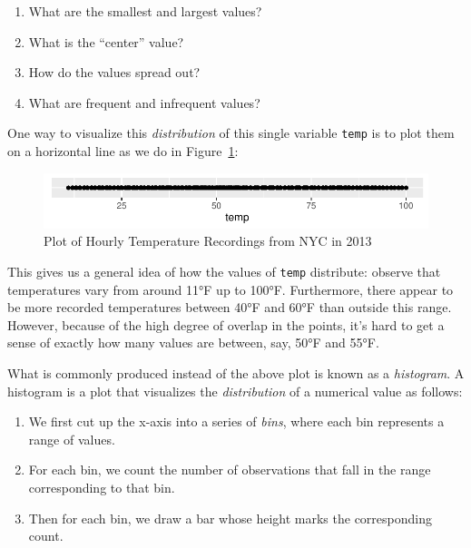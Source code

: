 \documentclass[
  letterpaper,
  DIV=11,
  numbers=noendperiod]{scrreprt}
\providecommand{\tightlist}{%
  \setlength{\itemsep}{0pt}\setlength{\parskip}{0pt}}\usepackage{longtable,booktabs,array}
\theoremstyle{definition}
\theoremstyle{remark}
\begin{document}
\begin{enumerate}
\def\labelenumi{\arabic{enumi}.}
\tightlist
\item
  What are the smallest and largest values?
\item
  What is the ``center'' value?
\item
  How do the values spread out?
\item
  What are frequent and infrequent values?
\end{enumerate}

One way to visualize this \emph{distribution} of this single variable
\texttt{temp} is to plot them on a horizontal line as we do in
Figure~\ref{fig-temp-on-line}:

\begin{figure}

{\centering \includegraphics{02-visualization_files/figure-pdf/fig-temp-on-line-1.pdf}

}

\caption{\label{fig-temp-on-line}Plot of Hourly Temperature Recordings
from NYC in 2013}

\end{figure}

This gives us a general idea of how the values of \texttt{temp}
distribute: observe that temperatures vary from around 11°F up to 100°F.
Furthermore, there appear to be more recorded temperatures between 40°F
and 60°F than outside this range. However, because of the high degree of
overlap in the points, it's hard to get a sense of exactly how many
values are between, say, 50°F and 55°F.

What is commonly produced instead of the above plot is known as a
\emph{histogram}. A histogram is a plot that visualizes the
\emph{distribution} of a numerical value as follows:

\begin{enumerate}
\def\labelenumi{\arabic{enumi}.}
\item
  We first cut up the x-axis into a series of \emph{bins}, where each
  bin represents a range of values.
\item
  For each bin, we count the number of observations that fall in the
  range corresponding to that bin.
\item
  Then for each bin, we draw a bar whose height marks the corresponding
  count.
\end{enumerate}
\end{document}
